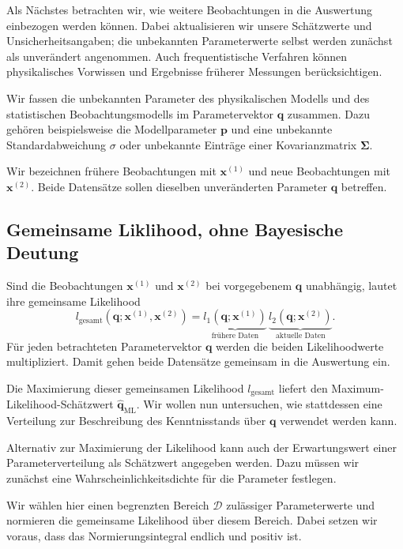 Als Nächstes betrachten wir, wie weitere Beobachtungen in die
Auswertung einbezogen werden können. Dabei aktualisieren wir
unsere Schätzwerte und Unsicherheitsangaben; die unbekannten
Parameterwerte selbst werden zunächst als unverändert angenommen.
Auch frequentistische Verfahren können physikalisches Vorwissen
und Ergebnisse früherer Messungen berücksichtigen.

Wir fassen die unbekannten Parameter des physikalischen Modells
und des statistischen Beobachtungsmodells im Parametervektor
$\mathbf q$ zusammen. Dazu gehören beispielsweise die
Modellparameter $\mathbf p$ und eine unbekannte
Standardabweichung $\sigma$ oder unbekannte Einträge einer
Kovarianzmatrix $\boldsymbol\Sigma$.

Wir bezeichnen frühere Beobachtungen mit $\mathbf x^{(1)}$
und neue Beobachtungen mit $\mathbf x^{(2)}$.
Beide Datensätze sollen dieselben unveränderten Parameter
$\mathbf q$ betreffen.

\subsection{Gemeinsame Liklihood, ohne Bayesische Deutung}

Sind die Beobachtungen $\mathbf x^{(1)}$ und 
$\mathbf x^{(2)}$ bei vorgegebenem $\mathbf q$
unabhängig, lautet ihre gemeinsame Likelihood
\begin{equation}
l_{\mathrm{gesamt}}(\mathbf q;\mathbf x^{(1)},\mathbf x^{(2)})
=
\underbrace{l_1(\mathbf q;\mathbf x^{(1)})}_{\text{frühere Daten}}
\,
\underbrace{l_2(\mathbf q;\mathbf x^{(2)})}_{\text{aktuelle Daten}}.
\label{eq:likelihoodgesamt}
\end{equation}
Für jeden betrachteten Parametervektor $\mathbf q$ werden
die beiden Likelihoodwerte multipliziert. Damit gehen beide
Datensätze gemeinsam in die Auswertung ein.

Die Maximierung dieser gemeinsamen Likelihood $l_{\mathrm{gesamt}}$ liefert den
Maximum-Likelihood-Schätzwert $\widehat{\mathbf q}_{\mathrm{ML}}$.
Wir wollen nun untersuchen, wie stattdessen eine Verteilung
zur Beschreibung des Kenntnisstands über $\mathbf q$
verwendet werden kann.

Alternativ zur Maximierung der Likelihood kann auch der
Erwartungswert einer Parameterverteilung als Schätzwert
angegeben werden. Dazu müssen wir zunächst eine
Wahrscheinlichkeitsdichte für die Parameter festlegen.

Wir wählen hier einen begrenzten Bereich $\mathcal D$
zulässiger Parameterwerte und normieren die gemeinsame
Likelihood über diesem Bereich. Dabei setzen wir voraus,
dass das Normierungsintegral endlich und positiv ist.

